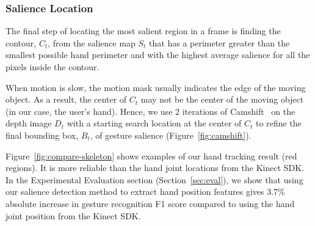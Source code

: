 \documentclass{sig-alternate-2013}
\begin{document}
\subsubsection{Salience Location}
The final step of locating the most salient region in a frame is finding the
contour, $C_t$, from the salience map $S_t$ that has a perimeter greater than
the smallest possible hand perimeter and with the highest average salience for all the pixels inside the contour.

When motion is slow, the motion mask usually indicates the edge of the moving
object. As a result, the center of $C_t$ may not be the center of the moving
object (in our case, the user's hand). Hence, we use 2 iterations of Camshift~\cite{Bradski98} on 
the depth image $D_t$ with a starting search location at the center of $C_t$ to refine
the final bounding box, $B_t$, of gesture salience (Figure~\ref{fig:camshift}). 

Figure~\ref{fig:compare-skeleton} shows examples of our hand tracking result (red regions). 
It is more reliable than the hand joint locations from the Kinect SDK. In the
Experimental Evaluation section (Section~\ref{sec:eval}), we show that using our 
salience detection method to extract hand position features gives 3.7\%
absolute increase in gesture recognition F1 score compared to using the hand
joint position from the Kinect SDK.
\end{document}
